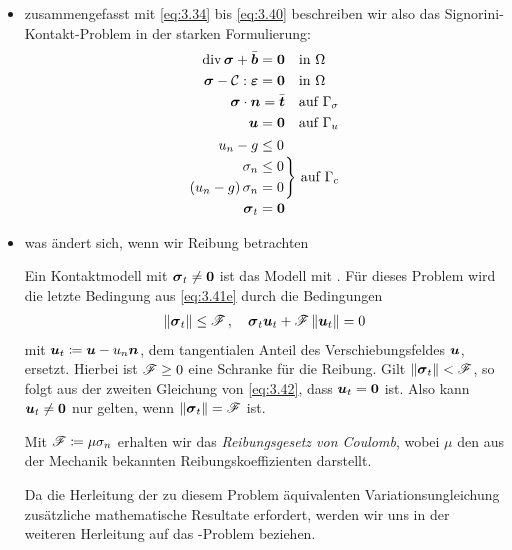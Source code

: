 \begin{itemize}
\item zusammengefasst mit \eqref{eq:3.34} bis \eqref{eq:3.40} beschreiben wir also das Signorini-Kontakt-Problem in der starken Formulierung:
\begin{subequations}\label{eq:3.41}
\begin{align}\label{eq:3.41a}
	\operatorname{div} \boldsymbol \sigma + \bar{\boldsymbol b} = \boldsymbol 0&\ \ \text{ in } \Omega\\
	\label{eq:3.41b}
	\boldsymbol \sigma  - \mathcal C :\boldsymbol {\varepsilon}  = \boldsymbol 0&\ \ \text{ in } \Omega\\
	\label{eq:3.41c}
	\boldsymbol \sigma \cdot \boldsymbol n = \bar{\boldsymbol t} &\ \ \text{ auf } \Gamma_\sigma \\
	\label{eq:3.41d}
	\boldsymbol u = \boldsymbol 0 &\ \ \text{ auf }\Gamma_u \\
	\label{eq:3.41e}
	\begin{aligned}
		 u_n  - g& \le 0 \\
		\sigma_n &\le 0 \\
		(u_n  - g)\,  \sigma_n &= 0  \\
		\boldsymbol \sigma_t &= \boldsymbol 0
	\end{aligned}&\Bigg\}
\text{ auf } \Gamma_c 
\end{align}
\end{subequations}

\item was ändert sich, wenn wir Reibung betrachten
\begin{bem}
Ein Kontaktmodell mit $\boldsymbol \sigma_t \not = \boldsymbol 0$ ist das Modell mit \textit{}. Für dieses Problem wird die letzte Bedingung aus \eqref{eq:3.41e} durch die Bedingungen
\begin{align}\label{eq:3.42}
	\lVert \boldsymbol \sigma_t\rVert \le \mathscr F \, , \quad \boldsymbol \sigma_t \boldsymbol u_t + \mathscr F\,  \lVert \boldsymbol u_t\rVert = 0
\end{align}
mit $\boldsymbol u_t \coloneqq \boldsymbol u - u_n \boldsymbol n$, dem tangentialen Anteil des Verschiebungsfeldes $\boldsymbol u$, ersetzt. Hierbei ist $\mathscr F \ge 0$ eine Schranke für die Reibung. Gilt $\lVert \boldsymbol \sigma_t\rVert < \mathscr F$, so folgt aus der zweiten Gleichung von \eqref{eq:3.42}, dass $\boldsymbol u_t = \boldsymbol 0$ ist. Also kann $\boldsymbol u_t \not=\boldsymbol 0$ nur gelten, wenn $\lVert \boldsymbol \sigma_t\rVert = \mathscr F$ ist.

Mit $\mathscr F \coloneqq \mu \sigma_n$ erhalten wir das \textit{Reibungsgesetz von Coulomb}, wobei $\mu$ den aus der Mechanik bekannten Reibungskoeffizienten darstellt.

Da die Herleitung der zu diesem Problem äquivalenten Variationsungleichung zusätzliche mathematische Resultate erfordert, werden wir uns in der weiteren Herleitung auf das -Problem beziehen.
\end{bem}
\end{itemize}






